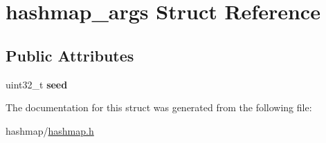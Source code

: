 \hypertarget{structhashmap__args}{}\section{hashmap\+\_\+args Struct Reference}
\label{structhashmap__args}
\subsection*{Public Attributes}
\begin{DoxyCompactItemize}
\item 
\mbox{\label{structhashmap__args_ae512628a8f83e3c1fca257201607b529}} 
uint32\+\_\+t {\bfseries seed}
\end{DoxyCompactItemize}


The documentation for this struct was generated from the following file\+:\begin{DoxyCompactItemize}
\item 
hashmap/\hyperlink{hashmap_8h}{hashmap.\+h}\end{DoxyCompactItemize}
